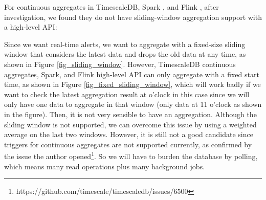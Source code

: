 For continuous aggregates in TimescaleDB, Spark \cite{10.1145/2783258.2789993}, and Flink \cite{10.14778/3137765.3137777}, after investigation, we found they do not have sliding-window aggregation support with a high-level API:

Since we want real-time alerts, we want to aggregate with a fixed-size sliding window that considers the latest data and drops the old data at any time, as shown in Figure \ref{fig_sliding_window}. However, TimescaleDB continuous aggregates, Spark, and Flink high-level API can only aggregate with a fixed start time, as shown in Figure \ref{fig_fixed_sliding_window}, which will work badly if we want to check the latest aggregation result at o'clock in this case since we will only have one data to aggregate in that window (only data at 11 o'clock as shown in the figure). Then, it is not very sensible to have an aggregation. Although the sliding window is not supported, we can overcome this issue by using a weighted average on the last two windows. However, it is still not a good candidate since triggers for continuous aggregates are not supported currently, as confirmed by the issue the author opened\footnote{https://github.com/timescale/timescaledb/issues/6500}. So we will have to burden the database by polling, which means many read operations plus many background jobs.

